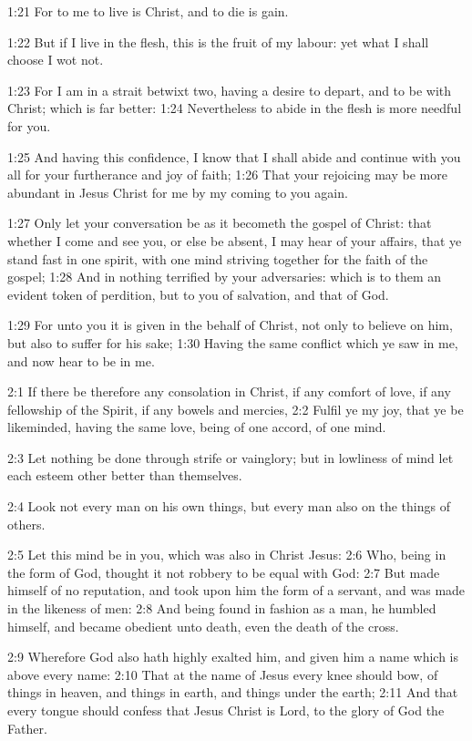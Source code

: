 1:21 For to me to live is Christ, and to die is gain.

1:22 But if I live in the flesh, this is the fruit of my labour: yet
what I shall choose I wot not.

1:23 For I am in a strait betwixt two, having a desire to depart, and
to be with Christ; which is far better: 1:24 Nevertheless to abide in
the flesh is more needful for you.

1:25 And having this confidence, I know that I shall abide and
continue with you all for your furtherance and joy of faith; 1:26 That
your rejoicing may be more abundant in Jesus Christ for me by my
coming to you again.

1:27 Only let your conversation be as it becometh the gospel of
Christ: that whether I come and see you, or else be absent, I may hear
of your affairs, that ye stand fast in one spirit, with one mind
striving together for the faith of the gospel; 1:28 And in nothing
terrified by your adversaries: which is to them an evident token of
perdition, but to you of salvation, and that of God.

1:29 For unto you it is given in the behalf of Christ, not only to
believe on him, but also to suffer for his sake; 1:30 Having the same
conflict which ye saw in me, and now hear to be in me.

2:1 If there be therefore any consolation in Christ, if any comfort of
love, if any fellowship of the Spirit, if any bowels and mercies, 2:2
Fulfil ye my joy, that ye be likeminded, having the same love, being
of one accord, of one mind.

2:3 Let nothing be done through strife or vainglory; but in lowliness
of mind let each esteem other better than themselves.

2:4 Look not every man on his own things, but every man also on the
things of others.

2:5 Let this mind be in you, which was also in Christ Jesus: 2:6 Who,
being in the form of God, thought it not robbery to be equal with God:
2:7 But made himself of no reputation, and took upon him the form of a
servant, and was made in the likeness of men: 2:8 And being found in
fashion as a man, he humbled himself, and became obedient unto death,
even the death of the cross.

2:9 Wherefore God also hath highly exalted him, and given him a name
which is above every name: 2:10 That at the name of Jesus every knee
should bow, of things in heaven, and things in earth, and things under
the earth; 2:11 And that every tongue should confess that Jesus Christ
is Lord, to the glory of God the Father.

